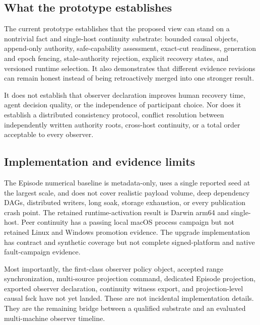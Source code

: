 \subsection{What the prototype establishes}

The current prototype establishes that the proposed view can stand on a
nontrivial fact and single-host continuity substrate: bounded causal objects,
append-only authority, safe-capability assessment, exact-cut readiness,
generation and epoch fencing, stale-authority rejection, explicit recovery
states, and versioned runtime selection. It also demonstrates that different
evidence revisions can remain honest instead of being retroactively merged into
one stronger result.

It does not establish that observer declaration improves human recovery time,
agent decision quality, or the independence of participant choice. Nor does it
establish a distributed consistency protocol, conflict resolution between
independently written authority roots, cross-host continuity, or a total order
acceptable to every observer.

\subsection{Implementation and evidence limits}

The Episode numerical baseline is metadata-only, uses a single reported seed at
the largest scale, and does not cover realistic payload volume, deep dependency
DAGs, distributed writers, long soak, storage exhaustion, or every publication
crash point. The retained runtime-activation result is Darwin arm64 and
single-host. Peer continuity has a passing local macOS process campaign but not
retained Linux and Windows promotion evidence. The upgrade implementation has
contract and synthetic coverage but not complete signed-platform and native
fault-campaign evidence.

Most importantly, the first-class observer policy object, accepted range
synchronization, multi-source projection command, dedicated Episode projection,
exported observer declaration, continuity witness export, and projection-level
causal fsck have not yet landed. These are not incidental implementation
details. They are the remaining bridge between a qualified substrate and an
evaluated multi-machine observer timeline.
